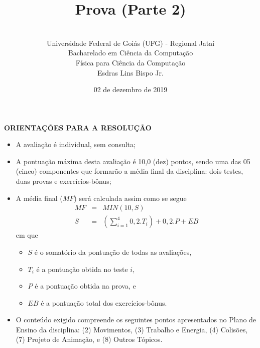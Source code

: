 \documentclass[12pt,a4paper,oneside]{article}
\author{\\Universidade Federal de Goiás (UFG) - Regional Jataí\\Bacharelado em Ciência da Computação \\Física para Ciência da Computação \\Esdras Lins Bispo Jr.}
\title{\sc \huge Prova (Parte 2)}
\date{02 de dezembro de 2019}
\begin{document}
\maketitle

{\bf ORIENTAÇÕES PARA A RESOLUÇÃO}

\footnotesize

\begin{itemize}
	\item A avaliação é individual, sem consulta;
	\item A pontuação máxima desta avaliação é 10,0 (dez) pontos, sendo uma das 05 (cinco) componentes que formarão a média final da disciplina: dois testes, duas provas e exercícios-bônus;
	\item A média final ($MF$) será calculada assim como se segue
	\begin{eqnarray}
		MF & = & MIN(10, S) \nonumber \\
		S & = & (\sum_{i=1}^{4} 0,2.T_i ) + 0,2.P  + EB \nonumber
	\end{eqnarray}
	em que 
	\begin{itemize}
		\item $S$ é o somatório da pontuação de todas as avaliações,
		\item $T_i$ é a pontuação obtida no teste $i$,
		\item $P$ é a pontuação obtida na prova, e
		\item $EB$ é a pontuação total dos exercícios-bônus.
	\end{itemize}
	\item O conteúdo exigido compreende os seguintes pontos apresentados no Plano de Ensino da disciplina: (2) Movimentos, (3) Trabalho e Energia, (4) Colisões, (7) Projeto de Animação, e (8) Outros Tópicos.
\end{itemize}


\begin{center}
\end{center}

\newpage

\normalsize
\end{document}
